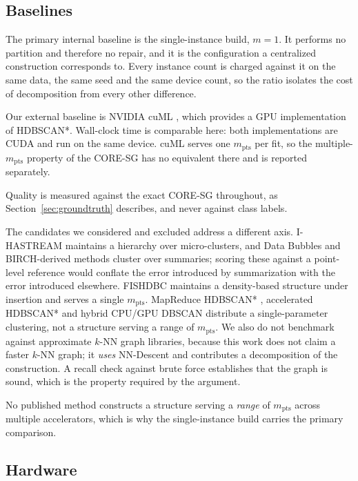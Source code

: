\documentclass{ieeeaccess}
\newcommand{\mpts}{m_{\mathrm{pts}}}
\begin{document}
\subsection{Baselines}

The primary internal baseline is the single-instance build, $m = 1$.
It performs no partition and therefore no repair, and it is the configuration a
centralized construction corresponds to. Every instance count is charged against
it on the same data, the same seed and the same device count, so the ratio
isolates the cost of decomposition from every other difference.

Our external baseline is NVIDIA cuML \cite{cuml}, which provides a
GPU implementation of HDBSCAN*. Wall-clock time is comparable here: both
implementations are CUDA and run on the same device. cuML serves one $\mpts$ per fit, so the multiple-$\mpts$ property of the
CORE-SG has no equivalent there and is reported separately.

Quality is measured against the exact CORE-SG throughout, as
Section~\ref{sec:groundtruth} describes, and never against class labels.

The candidates we considered and excluded address a different axis.
I-HASTREAM \cite{ihastream} maintains a hierarchy over micro-clusters, and Data
Bubbles \cite{databubbles} and BIRCH-derived methods \cite{birch} cluster over
summaries; scoring these against a point-level reference would conflate the
error introduced by summarization with the error introduced elsewhere.
FISHDBC \cite{fishdbc} maintains a density-based structure under insertion and
serves a single $\mpts$. MapReduce HDBSCAN* \cite{mrhdbscan}, accelerated
HDBSCAN* \cite{acceleratedhdbscan} and hybrid CPU/GPU DBSCAN \cite{bpshdbscan}
distribute a single-parameter clustering, not a structure serving a range of
$\mpts$. We also do not benchmark against approximate $k$-NN graph libraries,
because this work does not claim a faster $k$-NN graph; it \emph{uses}
NN-Descent \cite{nndescent, dynamic_nndescent} and contributes a decomposition
of the construction. A recall check against brute force establishes that the
graph is sound, which is the property required by the argument.

No published method constructs a structure serving a \emph{range} of $\mpts$
across multiple accelerators, which is why the single-instance build carries the
primary comparison.

\subsection{Hardware}
\end{document}
